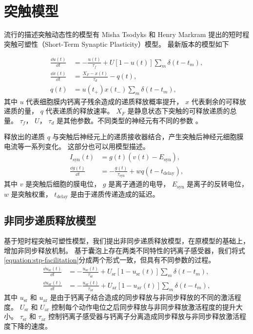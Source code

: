 \section{突触模型}
\label{section:model:synapse-model}
流行的描述突触动态性的模型有 Misha Tsodyks 和 Henry Markram 提出的短时程突触可塑性（Short-Term Synaptic Plasticity）模型\cite{Markram1996,Tsodyks1997}。
最新版本的模型如下\cite{Tsodyks2013}

\begin{align}
\frac{\dd{u\left(t\right)}}{\dd{t}} &=  -\frac{u\left(t\right)}{\tau_f}+U\left[1-u\left(t\right)\right]\sum_m \delta\left(t-t_m\right), \label{equation:stp-facilitation} \\
\frac{\dd{x\left(t\right)}}{\dd{t}} &=
\frac{X_F-x\left(t\right)}{\tau_d} - q(t),
\label{equation:stp-depression} \\
q(t) & = u\left(t_+\right)x\left(t_-\right) \sum_m \delta\left(t-t_m\right),
\label{equation:stp-release}
\end{align}
其中 $u$ 代表细胞膜内钙离子残余造成的递质释放概率提升， $x$ 代表剩余的可释放递质的量， $q$ 代表递质的释放速率。 
$X_F$ 是静息状态下突触的可释放递质的总量。 
$\tau_f$， $U$， $\tau_d$ 是其他参数。不同类型的神经元有不同的参数 \cite{Silberberg2005}。

释放出的递质 $q$ 与突触后神经元上的递质接收器结合，产生突触后神经元细胞膜电流等一系列变化。
这部分也可以用模型描述\cite{Destexhe1994}。
\begin{align}
I_\text{syn}(t) &= g(t)\left(v(t) - E_\text{syn}\right), \label{equation:synaptic-current-general} \\
\frac{\dd{g(t)}}{\dd{t}} &= -\frac{g(t)}{\tau_\text{syn}} + wq(t - t_\text{delay}), \label{equation:receptor-conductance-general}
\end{align}
其中 $v$ 是突触后细胞的膜电位， $g$ 是离子通道的电导， $E_\text{syn}$ 是离子的反转电位， $w$ 是突触权重， $t_\text{delay}$ 是由于递质传递造成的延迟。

\subsection{非同步递质释放模型}
\label{section:model:asynchronous-release}
基于短时程突触可塑性模型，我们提出非同步递质释放模型，在原模型的基础上，增加非同步释放机制。
基于囊泡上存在两类不同特性的钙离子感受器，我们将式\ref{equation:stp-facilitation}分成两个形式一致，但具有不同参数的过程。
\begin{align}
\frac{\dd{u_\text{sr}\left(t\right)}}{\dd{t}} &= -\frac{u_\text{sr}\left(t\right)}{\tau_\text{sr}}+U_\text{sr}\left[1-u_\text{sr}\left(t\right)\right]\sum_m \delta\left(t-t_m\right), \label{equation:sr-facilitation} \\
\frac{\dd{u_\text{ar}\left(t\right)}}{\dd{t}} &= -\frac{u_\text{ar}\left(t\right)}{\tau_\text{ar}}+U_\text{ar}\left[1-u_\text{ar}\left(t\right)\right]\sum_m \delta\left(t-t_m\right), \label{equation:ar-facilitation}
\end{align}
其中 $u_\text{sr}$ 和 $u_\text{ar}$ 是由于钙离子结合造成的同步释放与非同步释放的不同的激活程度。
$U_\text{sr}$ 和 $U_\text{ar}$ 控制每个动作电位之后同步释放与非同步释放激活程度的提升大小。
$\tau_\text{sr}$ 和 $\tau_\text{ar}$ 控制钙离子感受器与钙离子分离造成同步释放与非同步释放激活程度下降的速度。

